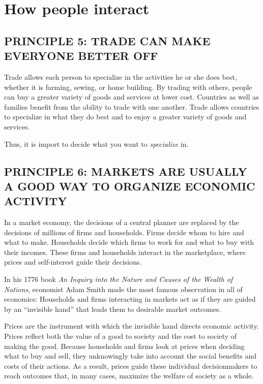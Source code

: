 \section{How people interact}

\subsection*{PRINCIPLE 5: TRADE CAN MAKE EVERYONE BETTER OFF}

Trade allows each person to specialize in the activities he or she does best, whether it is farming, sewing, or home building.
By trading with others, people can buy a greater variety of goods and services at lower cost.
Countries as well as families benefit from the ability to trade with one another.
Trade allows countries to specialize in what they do best and to enjoy a greater variety of goods and services.

\begin{tcolorbox}
  Thus, it is import to decide what you want to \emph{specialize} in.
\end{tcolorbox}


\subsection*{PRINCIPLE 6: MARKETS ARE USUALLY A GOOD WAY TO ORGANIZE ECONOMIC ACTIVITY}

In a market economy, the decisions of a central planner are replaced by the decisions of millions of firms and households.
Firms decide whom to hire and what to make.
Households decide which firms to work for and what to buy with their incomes.
These firms and households interact in the marketplace, where prices and self-interest guide their decisions.

In his 1776 book \emph{An Inquiry into the Nature and Causes of the Wealth of Nations}, economist Adam Smith made the most famous observation in all of economics: Households and firms interacting in markets act as if they are guided by an ``invisible hand'' that leads them to desirable market outcomes.

Prices are the instrument with which the invisible hand directs economic activity.
Prices reflect both the value of a good to society and the cost to society of making the good.
Because households and firms look at prices when deciding what to buy and sell, they unknowingly take into account the social benefits and costs of their actions.
As a result, prices guide these individual decisionmakers to reach outcomes that, in many cases, maximize the welfare of society as a whole.


